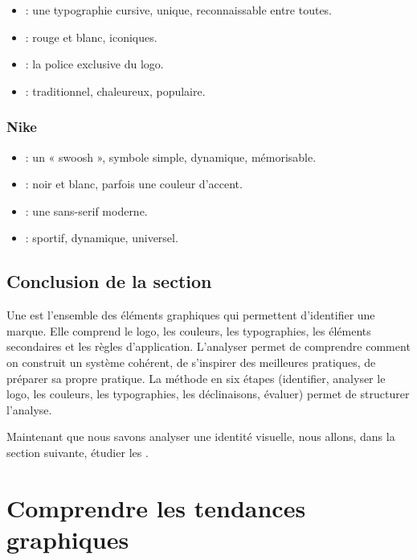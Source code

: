 \begin{itemize}
    \item {} : une typographie cursive, unique, reconnaissable entre toutes.
    \item {} : rouge et blanc, iconiques.
    \item {} : la police exclusive du logo.
    \item {} : traditionnel, chaleureux, populaire.
\end{itemize}

\subsubsection{Nike}

\begin{itemize}
    \item {} : un « swoosh », symbole simple, dynamique, mémorisable.
    \item {} : noir et blanc, parfois une couleur d'accent.
    \item {} : une sans-serif moderne.
    \item {} : sportif, dynamique, universel.
\end{itemize}

\subsection*{Conclusion de la section}

\begin{retenir}
Une  est l'ensemble des éléments graphiques qui permettent d'identifier une marque. Elle comprend le logo, les couleurs, les typographies, les éléments secondaires et les règles d'application. L'analyser permet de comprendre comment on construit un système cohérent, de s'inspirer des meilleures pratiques, de préparer sa propre pratique. La méthode en six étapes (identifier, analyser le logo, les couleurs, les typographies, les déclinaisons, évaluer) permet de structurer l'analyse.
\end{retenir}

Maintenant que nous savons analyser une identité visuelle, nous allons, dans la section suivante, étudier les .

\section{Comprendre les tendances graphiques}

